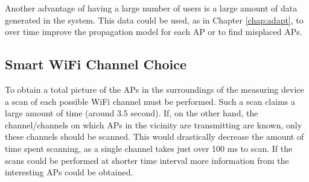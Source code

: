 \documentclass{LTHthesis}
\begin{document}
Another advantage of having a large number of users is a large amount of data generated in the system. This data could be used, as in Chapter \ref{chap:adapt}, to over time improve the propagation model for each AP or to find misplaced APs.     
%
\subsection{Smart WiFi Channel Choice}
%
To obtain a total picture of the APs in the surroundings of the measuring device a scan of each possible WiFi channel must be performed. Such a scan claims a large amount of time (around 3.5 second). If, on the other hand, the channel/channels on which APs in the vicinity are transmitting are known, only these channels should be scanned. This would drastically decrease the amount of time spent scanning, as a single channel takes just over 100 ms to scan. If the scans could be performed at shorter time interval more information from the interesting APs could be obtained.   
%
\printbibliography  %
\end{document}
